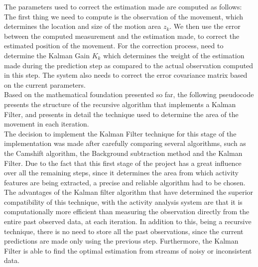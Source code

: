 \documentclass[11pt]{report}
\begin{document}
The parameters used to correct the estimation made are computed as follows:\\
The first thing we need to compute is the observation of the movement, which determines the location and size of the motion area \(z_k\). We then use the error between the computed measurement and the estimation made, to correct the estimated position of the movement. For the correction process, need to determine the Kalman Gain \(K_k\) which determines the weight of the estimation made during the prediction step as compared to the actual observation computed in this step. The system also needs to correct the error covariance matrix based on the current parameters. \\

Based on the mathematical foundation presented so far, the following pseudocode presents the structure of the recursive algorithm that implements a Kalman Filter, and presents in detail the technique used to determine the area of the movement in each iteration. \\



The decision to implement the Kalman Filter technique for this stage of the implementation was made after carefully comparing several algorithms, such as the Camshift algorithm, the Background subtraction method and the Kalman Filter. Due to the fact that this first stage of the project has a great influence over all the remaining steps, since it determines the area from which activity features are being extracted, a precise and reliable algorithm had to be chosen. The advantages of the Kalman filter algorithm that have determined the superior compatibility of this technique, with the activity analysis system are that it is computationally more efficient than measuring the observation directly from the entire past observed data, at each iteration. In addition to this, being a recursive technique, there is no need to store all the past observations, since the current predictions are made only using the previous step. Furthermore, the Kalman Filter is able to find the optimal estimation from streams of noisy or inconsistent data. \\
\end{document}
